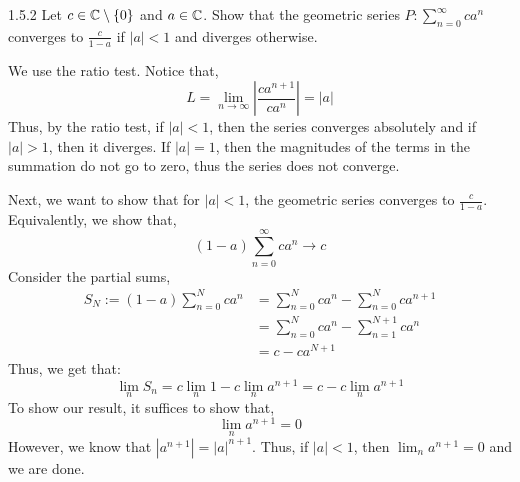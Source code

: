 \documentclass[12pt]{amsart}
\begin{document}
\begin{problem}{1.5.2}
    Let $c \in \mathbb C \setminus \{0\}$ and $a \in \mathbb C$. Show that the geometric series $P: \sum_{n=0}^\infty ca^n$ converges to $\frac{c}{1-a}$ if $|a| < 1$ and diverges otherwise. 
\end{problem}
\begin{solution}
    We use the ratio test. Notice that, 
    \[ L = \lim_{n\to \infty} \left|\frac{ca^{n+1}}{ca^{n}}\right| = \left|a\right| \]
    Thus, by the ratio test, if $|a| < 1$, then the series converges absolutely and if $|a| > 1$, then it diverges. If $|a| = 1$, then the magnitudes of the terms in the summation do not go to zero, thus the series does not converge. 

    Next, we want to show that for $|a| < 1$, the geometric series converges to $\frac{c}{1-a}$. Equivalently, we show that, 
    \[ (1-a)\sum_{n=0}^\infty ca^n \to c \]
    Consider the partial sums, 
    \begin{align*}
        S_N := (1-a)\sum_{n=0}^N ca^n &= \sum_{n=0}^N ca^n - \sum_{n=0}^N ca^{n+1} \\
        &= \sum_{n=0}^N ca^n - \sum_{n=1}^{N+1} ca^{n} \\
        &= c-ca^{N+1}
    \end{align*}
    Thus, we get that:
    \[ \lim_n S_n = c\lim_n 1 - c \lim_n a^{n+1} = c - c\lim_n a^{n+1}\]
    To show our result, it suffices to show that, 
    \[ \lim_n a^{n+1} = 0 \]
    However, we know that $|a^{n+1}| = |a|^{n+1}$. Thus, if $|a| < 1$, then $\lim_{n} a^{n+1} = 0$ and we are done. 
\end{solution}
\newpage 
\end{document}
